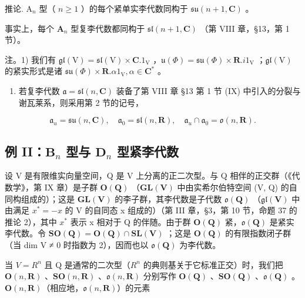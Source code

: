 推论. \(\mathrm{A}_n\) 型（ \(n \geq 1\) ）的每个紧单实李代数同构于 \(\mathfrak{su}(n + 1, \mathbf{C})\) 。

事实上，每个 \(\mathbf{A}_n\) 型复李代数都同构于 \(\mathfrak{sl}(n + 1,\mathbf{C})\) （第 VIII 章，§13，第 1 节）。

注。1) 我们有 \(\mathfrak{gl}(\mathrm{V}) = \mathfrak{sl}(\mathrm{V}) \times \mathbf{C}.1_{\mathrm{V}}\) ，\(\mathfrak{u}(\varPhi) = \mathfrak{su}(\varPhi) \times \mathbf{R}.i1_{\mathrm{V}}\) ；\(\mathfrak{gl}(\mathrm{V})\) 的紧实形式是诸 \(\mathfrak{su}(\varPhi) \times \mathbf{R}. \alpha 1_{\mathrm{V}}, \alpha \in \mathbf{C}^*\) 。

\begin{enumerate}
\def\labelenumi{\arabic{enumi})}
\setcounter{enumi}{1}
\tightlist
\item
  若复李代数 \(\mathfrak{a} = \mathfrak{sl}(n,\mathbf{C})\) 装备了第 VIII 章 §13 第 1 节 (IX) 中引入的分裂与谢瓦莱系，则采用第 2 节的记号，
\end{enumerate}

\[
\mathfrak {a} _ {u} = \mathfrak {s u} (n, \mathbf {C}), \quad \mathfrak {a} _ {0} = \mathfrak {s l} (n, \mathbf {R}), \quad \mathfrak {a} _ {u} \cap \mathfrak {a} _ {0} = \mathfrak {o} (n, \mathbf {R}).
\]

\subsection{\texorpdfstring{例 II：\(\mathbf{B}_n\) 型与 \(\mathbf{D}_n\) 型紧李代数}{例 II：\textbackslash mathbf\{B\}\_n 型与 \textbackslash mathbf\{D\}\_n 型紧李代数}}

设 V 是有限维实向量空间，Q 是 V 上分离的正二次型。与 Q 相伴的正交群（《代数学》，第 IX 章）是子群 \(\mathbf{O}(\mathbf{Q})\) （\(\mathbf{GL}(\mathbf{V})\) 中由实希尔伯特空间 (V, Q) 的自同构组成的）；这是 \(\mathbf{GL}(\mathbf{V})\) 的李子群，其李代数是子代数 \(\mathfrak{o}(\mathbf{Q})\) （\(\mathfrak{gl}(\mathbf{V})\) 中由满足 \(x^{*} = -x\) 的 V 的自同态 x 组成的）（第 III 章，§3，第 10 节，命题 37 的推论 2），其中 \(x^{*}\) 表示 x 相对于 Q 的伴随。由于群 \(\mathbf{O}(\mathbf{Q})\) 紧，\(\mathfrak{o}(\mathbf{Q})\) 是紧实李代数。令 \(\mathbf{SO}(\mathbf{Q}) = \mathbf{O}(\mathbf{Q}) \cap \mathbf{SL}(\mathbf{V})\) ；这是 \(\mathbf{O}(\mathbf{Q})\) 的有限指数闭子群（当 dim V ≠ 0 时指数为 2），因而也以 \(\mathfrak{o}(\mathbf{Q})\) 为李代数。

当 \(V = R^{n}\) 且 Q 是通常的二次型（\(R^{n}\) 的典则基关于它标准正交）时，我们把 \(\mathbf{O}(n, \mathbf{R})\) 、\(\mathbf{SO}(n, \mathbf{R})\) 、\(\mathfrak{o}(n, \mathbf{R})\) 分别写作 \(\mathbf{O}(\mathbf{Q})\) 、\(\mathbf{SO}(\mathbf{Q})\) 、\(\mathfrak{o}(\mathbf{Q})\) 。\(\mathbf{O}(n, \mathbf{R})\)（相应地，\(\mathfrak{o}(n, \mathbf{R})\)）的元素

